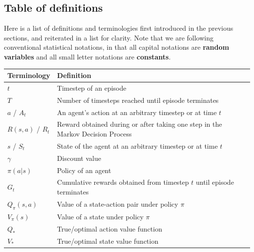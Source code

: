 \documentclass[12pt]{report}
\begin{document}
\subsection{Table of definitions}
Here is a list of definitions and terminologies first introduced in the previous sections, and reiterated in a list for clarity. Note that we are following conventional statistical notations, in that all capital notations are \textbf{random variables} and all small letter notations are \textbf{constants}. 
\begin{center}
    \small
    \begin{tabular}{ l | p{10cm} }
    Terminology & Definition \\ \hline
    $t$ & Timestep of an episode \\
    $T$ & Number of timesteps reached until episode terminates \\
    $a$ / $A_t$ & An agent's action at an arbitrary timestep or at time $t$\\ 
    $R(s,a)$ / $R_t$ & Reward obtained during or after taking one step in the Markov Decision Process\\ 
    $s$ / $S_t$ & State of the agent at an arbitrary timestep or at time $t$ \\
    $\gamma$ & Discount value \\ 
    $\pi(a|s)$ & Policy of an agent \\ 
    $G_t$ & Cumulative rewards obtained from timestep $t$ until episode terminates \\ 
    $Q_\pi(s,a)$ & Value of a state-action pair under policy $\pi$ \\ 
    $V_\pi(s)$ & Value of a state under policy $\pi$ \\ 
    $Q_*$ & True/optimal action value function\\
    $V_*$ & True/optimal state value function
    \end{tabular}
\end{center}
\end{document}
